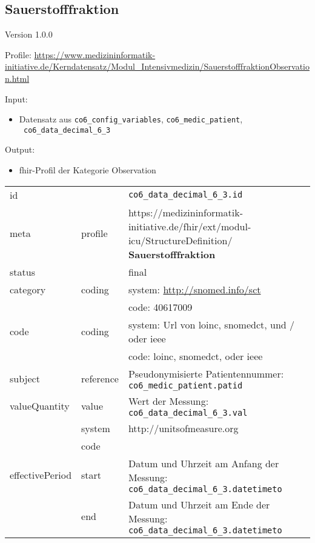 \subsection{Sauerstofffraktion} 
\noindent Version 1.0.0

\noindent Profile: \url{https://www.medizininformatik-initiative.de/Kerndatensatz/Modul_Intensivmedizin/SauerstofffraktionObservation.html}

\noindent Input:
\begin{itemize}
	\item Datensatz aus \texttt{co6\_config\_variables}, \texttt{co6\_medic\_patient}, \\ \texttt{
co6\_data\_decimal\_6\_3}
\end{itemize}
Output:
\begin{itemize}
        \item \ac{fhir}-Profil der Kategorie \glqq Observation\grqq{}
\end{itemize}
\begin{longtable}{|l|l|p{7.5cm}|}
        \hline
        \rowcolor{lightgray} \multicolumn{3}{|l|}{Data Mapping (inhaltlich)} \\ \hline
        id &  & \texttt{co6\_data\_decimal\_6\_3.id} \\ \hline
	meta & profile & https://medizininformatik-initiative.de/fhir/ext/modul-icu/StructureDefinition/\textbf{
Sauerstofffraktion} \\ \hline 
	status &  & final  \\ \hline 
	category & coding & system: \url{http://snomed.info/sct} \\
\cline{3-3}
	& & code: 40617009 \\ \hline
	code & coding & system: Url von \ac{loinc}, \ac{snomedct}, und / oder \ac{ieee} \\ 
	\cline{3-3} 
	 &  & code: \ac{loinc}, \ac{snomedct}, oder \ac{ieee} \\ \hline
	subject & reference & Pseudonymisierte Patientennummer: \texttt{co6\_medic\_patient.patid} \\ \hline
	valueQuantity & value & Wert der Messung: \texttt{
co6\_data\_decimal\_6\_3.val} \\
        \cline{2-3}
         & system & http://unitsofmeasure.org \\
         \cline{2-3}
         & code & \\ \hline
    effectivePeriod & start & Datum und Uhrzeit am Anfang der Messung: \texttt{co6\_data\_decimal\_6\_3.datetimeto} \\
    \cline{2-3}
     & end & Datum und Uhrzeit am Ende der Messung: \texttt{co6\_data\_decimal\_6\_3.datetimeto} \\ \hline
\end{longtable}



